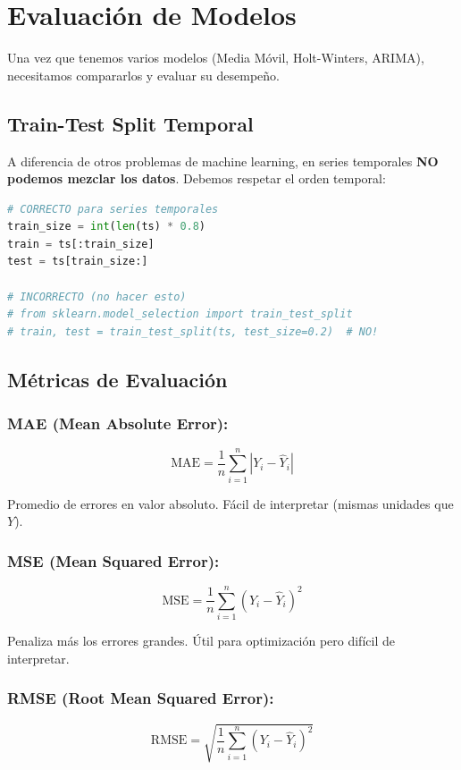 \documentclass[12pt]{article}
\begin{document}
\section{Evaluación de Modelos}

Una vez que tenemos varios modelos (Media Móvil, Holt-Winters, ARIMA), necesitamos compararlos y evaluar su desempeño.

\subsection{Train-Test Split Temporal}

A diferencia de otros problemas de machine learning, en series temporales \textbf{NO podemos mezclar los datos}. Debemos respetar el orden temporal:

\begin{lstlisting}[language=Python]
# CORRECTO para series temporales
train_size = int(len(ts) * 0.8)
train = ts[:train_size]
test = ts[train_size:]

# INCORRECTO (no hacer esto)
# from sklearn.model_selection import train_test_split
# train, test = train_test_split(ts, test_size=0.2)  # NO!
\end{lstlisting}

\subsection{Métricas de Evaluación}

\subsubsection{MAE (Mean Absolute Error):}
\[
\text{MAE} = \frac{1}{n} \sum_{i=1}^{n} |Y_i - \hat{Y}_i|
\]

Promedio de errores en valor absoluto. Fácil de interpretar (mismas unidades que $Y$).

\subsubsection{MSE (Mean Squared Error):}
\[
\text{MSE} = \frac{1}{n} \sum_{i=1}^{n} (Y_i - \hat{Y}_i)^2
\]

Penaliza más los errores grandes. Útil para optimización pero difícil de interpretar.

\subsubsection{RMSE (Root Mean Squared Error):}
\[
\text{RMSE} = \sqrt{\frac{1}{n} \sum_{i=1}^{n} (Y_i - \hat{Y}_i)^2}
\]
\end{document}
